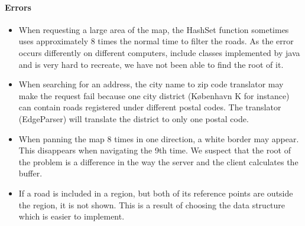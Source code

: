 \documentclass[a4paper,10pt,titlepage]{article}
\begin{document}
\paragraph{Errors}
		\begin{itemize}
\item When requesting a large area of the map, the HashSet function sometimes uses approximately 8 times the normal time to filter the roads. As the error occurs differently on different computers, include classes implemented by java and is very hard to recreate, we have not been able to find the root of it.

\item When searching for an address, the city name to zip code translator may make the request fail because one city district (København K for instance) can contain roads registered under different postal codes. The translator (EdgeParser) will translate the district to only one postal code.

\item When panning the map 8 times in one direction, a white border may appear. This disappears when navigating the 9th time. We suspect that the root of the problem is a difference in the way the server and the client calculates the buffer.

\item If a road is included in a region, but both of its reference points are outside the region, it is not shown. This is a result of choosing the data structure which is easier to implement.
		\end{itemize}
\end{document}
